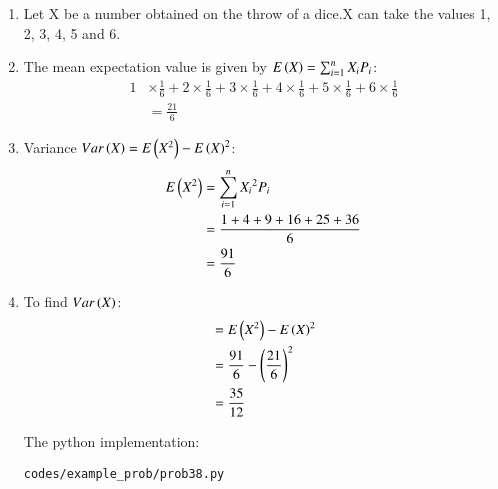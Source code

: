 \renewcommand{\theequation}{\theenumi}
\begin{enumerate}

\item Let X be a number obtained on the throw of a dice.X can take the values 1, 2, 3, 4, 5 and 6.

\item The mean expectation value is given by $ E\left(X\right) = \sum^n_{i=1}X_iP_i$:
\begin{align}
1 &\times \frac{1}{6} + 2 \times \frac{1}{6} + 3 \times \frac{1}{6} + 4 \times \frac{1}{6}
+ 5 \times \frac{1}{6} + 6 \times \frac{1}{6}\\
&= \frac{21}{6}
\end{align}

\item Variance $Var\left(X\right) = E\left(X^2\right)- {E\left(X\right)}^2$:
\begin{align}
E\left(X^2\right) &=  \sum^n_{i=1}{X_i}^2P_i\\
&= \frac{1+4+9+16+25+36}{6}\\
&= \frac{91}{6}
\end{align}


\item To find $Var\left(X\right)$:
\begin{align}
&= E\left(X^2\right) - {E\left(X\right)}^2\\
&= \frac{91}{6} - \left(\frac{21}{6}\right)^2 \\
&= \frac{35}{12}
\end{align}

The python implementation:
\begin{lstlisting}
codes/example_prob/prob38.py
\end{lstlisting}

\end{enumerate}